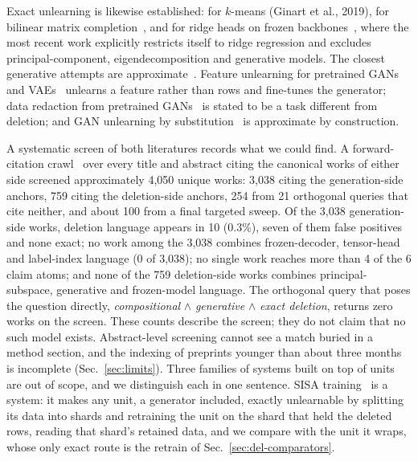 \documentclass{article} %
\begin{document}
Exact unlearning is likewise established: for $k$-means (Ginart et al., 2019\nocite{ginart2019making}), for bilinear
matrix completion~\citep{xu2023netflix}, and for ridge heads on frozen backbones~\citep{quan2026exact}, where the most recent work
explicitly restricts itself to ridge regression and excludes principal-component,
eigendecomposition and generative models. The closest generative attempts are approximate~\citep{kong2022approximate}.
Feature unlearning for pretrained GANs and VAEs~\citep{moon2024feature} unlearns a feature rather than rows and
fine-tunes the generator; data redaction from pretrained GANs~\citep{kong2023data} is stated to be a task different
from deletion; and GAN unlearning by substitution~\citep{sun2025generative} is approximate by construction.

A systematic screen of both literatures records what we could find. A
forward-citation crawl~\citep{priem2022openalex} over every title and abstract citing the canonical works of either side
screened approximately 4,050 unique works: 3,038 citing the generation-side anchors, 759 citing
the deletion-side anchors, 254 from 21 orthogonal queries that cite neither, and about 100 from
a final targeted sweep. %
Of the 3,038 generation-side works, deletion language appears in 10 (0.3\%), seven of them
false positives and none exact; no work among the 3,038 combines frozen-decoder, tensor-head
and label-index language (0 of 3,038); no single work reaches more than 4 of the 6 claim atoms;
and none of the 759 deletion-side works combines principal-subspace, generative and
frozen-model language. %
The orthogonal query that poses the question directly, \emph{compositional} $\wedge$
\emph{generative} $\wedge$ \emph{exact deletion}, returns zero works on the screen.
These counts describe the screen; they do not claim that no such model exists. Abstract-level
screening cannot see a match buried in a method section, and the indexing of preprints younger
than about three months is incomplete (Sec.~\ref{sec:limits}).
Three families of systems built on top of units are out of scope, and we distinguish each in one sentence.
SISA training~\citep{bourtoule2021machine} is a system: it makes any unit, a generator included,
exactly unlearnable by splitting its data into shards and retraining the unit on the shard that
held the deleted rows, reading that shard's retained data, and we compare with the unit it wraps,
whose only exact route is the retrain of Sec.~\ref{sec:del-comparators}.
\end{document}
